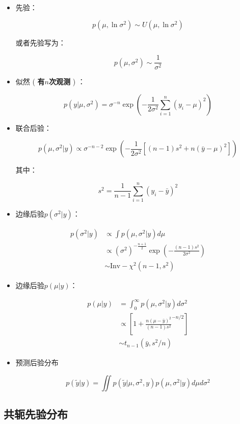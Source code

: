 \begin{itemize}
\item
  先验：

\begin{equation}
  p(\mu,\ln\sigma^2)\sim U(\mu,\ln \sigma^2)
\end{equation}

  或者先验写为：

  \[p(\mu,\sigma^2)\sim\frac{1}{\sigma^2}\]
\item
  似然 ( \textbf{有\(n\)次观测 }) ：

  \[p(y|\mu,\sigma^2)=\sigma^{-n}\exp \left(
  -\frac{1}{2\sigma^2}\sum_{i=1}^{n}(y_i-\mu)^2
  \right)\]
\item
  联合后验：

  \[p(\mu,\sigma^2|y)\propto \sigma^{-n-2}\exp\left(
  -\frac{1}{2\sigma^2}[(n-1)s^2+n(\bar{y}-\mu)^2]
  \right)\]

  其中：

  \[s^2=\frac{1}{n-1}\sum_{i=1}^{n}(y_i-\bar y)^2\]
\item
  边缘后验\(p(\sigma^2|y)\)：

\begin{equation}
  \begin{aligned}
  p(\sigma^2|y)
  &\propto \int p(\mu,\sigma^2|y)d\mu\\
  &\propto(\sigma^2)^{-\frac{n+1}{2}}\exp\left(
  -\frac{(n-1)s^2}{2\sigma^2}
  \right)\\
  &\sim \textrm{Inv}-\chi^2(n-1,s^2)
  \end{aligned}
\end{equation}

\item
  边缘后验\(p(\mu|y)\)：

  \begin{align*}
  p(\mu|y)
  &=\int_0^{\infty}p(\mu,\sigma^2|y)d\sigma^2\\
  &\propto\left[
  1+\frac{n(\mu-\bar y)^2}{(n-1)s^2}^{-n/2}
  \right] \\
  &\sim t_{n-1}(\bar y,s^2/n)
  \end{align*}
\item
  预测后验分布

  \[p(\widetilde y|y)=\iint  p(\widetilde y |\mu,\sigma^2,y)p(\mu,\sigma^2|y)
  d\mu d\sigma^2\]
\end{itemize}

\subsection{共轭先验分布}


